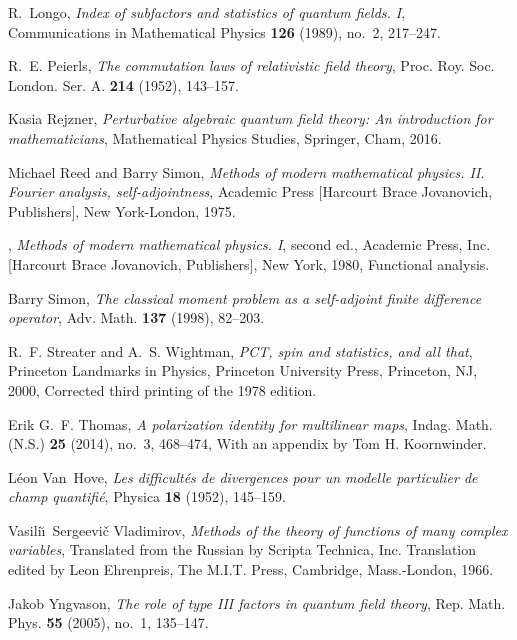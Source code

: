 \documentclass[12pt,a4paper]{article}
\newcommand{\1}{\mathds{1}}                         %
\begin{document}
{\begin{thebibliography}{BDFY15}
	R.~Longo, \emph{Index of subfactors and statistics of quantum fields. {I}},
	Communications in Mathematical Physics \textbf{126} (1989), no.~2, 217--247.
	
	R.~E. Peierls, \emph{The commutation laws of relativistic field theory}, Proc.
	Roy. Soc. London. Ser. A. \textbf{214} (1952), 143--157. 
	
	Kasia Rejzner, \emph{Perturbative algebraic quantum field theory: An
		introduction for mathematicians}, Mathematical Physics Studies, Springer,
	Cham, 2016. 
	
	Michael Reed and Barry Simon, \emph{Methods of modern mathematical physics.
		{II}. {F}ourier analysis, self-adjointness}, Academic Press [Harcourt Brace
	Jovanovich, Publishers], New York-London, 1975. 
	
	\bysame, \emph{Methods of modern mathematical physics. {I}}, second ed.,
	Academic Press, Inc. [Harcourt Brace Jovanovich, Publishers], New York, 1980,
	Functional analysis. 
	
	Barry Simon, \emph{The classical moment problem as a self-adjoint finite
		difference operator}, Adv. Math. \textbf{137} (1998), 82--203.
	
	R.~F. Streater and A.~S. Wightman, \emph{P{CT}, spin and statistics, and all
		that}, Princeton Landmarks in Physics, Princeton University Press, Princeton,
	NJ, 2000, Corrected third printing of the 1978 edition. 
	
	Erik G.~F. Thomas, \emph{A polarization identity for multilinear maps}, Indag.
	Math. (N.S.) \textbf{25} (2014), no.~3, 468--474, With an appendix by Tom H.
	Koornwinder. 
	
	L\'{e}on Van~Hove, \emph{Les difficult\'{e}s de divergences pour un modelle
		particulier de champ quantifi\'{e}}, Physica \textbf{18} (1952), 145--159.
	
	Vasili\u{\i}~Sergeevi\v{c} Vladimirov, \emph{Methods of the theory of functions
		of many complex variables}, Translated from the Russian by Scripta Technica,
	Inc. Translation edited by Leon Ehrenpreis, The M.I.T. Press, Cambridge,
	Mass.-London, 1966. 
	
	Jakob Yngvason, \emph{The role of type {III} factors in quantum field theory},
	Rep. Math. Phys. \textbf{55} (2005), no.~1, 135--147. 
	

\end{thebibliography}}
\end{document}
